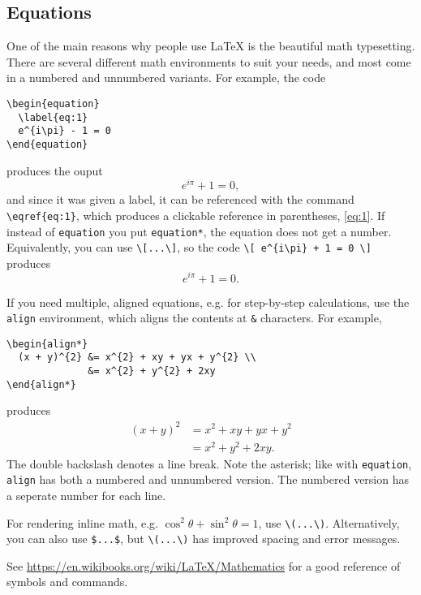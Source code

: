 \subsection{Equations}
\label{sec:equations}

One of the main reasons why people use \LaTeX{} is the beautiful math typesetting.
There are several different math environments to suit your needs, and most come in a numbered and unnumbered variants.
For example, the code
%
\begin{verbatim}
\begin{equation}
  \label{eq:1}
  e^{i\pi} - 1 = 0
\end{equation}
\end{verbatim}
%
produces the ouput
%
\begin{equation}
  \label{eq:1}
  e^{i\pi} + 1 = 0 ,
\end{equation}
%
and since it was given a label, it can be referenced with the command \verb!\eqref{eq:1}!, which produces a clickable reference in parentheses, \eqref{eq:1}.
If instead of \texttt{equation} you put \texttt{equation*}, the equation does not get a number.
Equivalently, you can use \verb!\[...\]!, so the code \verb!\[ e^{i\pi} + 1 = 0 \]! produces
\[ e^{i\pi} + 1 = 0 .\]

If you need multiple, aligned equations, e.g. for step-by-step calculations, use the \texttt{align} environment, which aligns the contents at \texttt{\&} characters.
For example,
%
\begin{verbatim}
\begin{align*}
  (x + y)^{2} &= x^{2} + xy + yx + y^{2} \\
              &= x^{2} + y^{2} + 2xy
\end{align*}
\end{verbatim}
%
produces
%
\begin{align*}
  (x + y)^{2} &= x^{2} + xy + yx + y^{2} \\
              &= x^{2} + y^{2} + 2xy .
\end{align*}
%
The double backslash denotes a line break.
Note the asterisk; like with \texttt{equation}, \texttt{align} has both a numbered and unnumbered version.
The numbered version has a seperate number for each line.

For rendering inline math, e.g. \(\cos^{2}\theta + \sin^{2}\theta = 1\), use \verb!\(...\)!.
Alternatively, you can also use \verb!$...$!, but \verb!\(...\)! has improved spacing and error messages.

See \url{https://en.wikibooks.org/wiki/LaTeX/Mathematics} for a good reference of symbols and commands.


